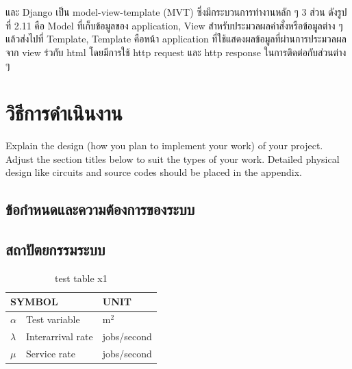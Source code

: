 \documentclass[12pt,oneside,openright,a4paper]{cpe-thai-project}
\begin{document}
\par\setlength{\parindent}{5ex}
และ Django เป็น model-view-template (MVT) ซึ่งมีกระบวนการทำงานหลัก ๆ 3 ส่วน ดังรูปที่ 2.11 คือ Model ที่เก็บข้อมูลของ application, View สำหรับประมวลผลคำสั่งหรือข้อมูลต่าง ๆ แล้วส่งไปที่ Template, Template คือหน้า application ที่ใช้แสดงผลข้อมูลที่ผ่านการประมวลผลจาก view ร่วกับ html โดยมีการใช้ http request และ http response ในการติดต่อกับส่วนต่าง ๆ 










\chapter{วิธีการดำเนินงาน}

Explain the design (how you plan to implement your work) of your project. Adjust the section titles below to suit the types of your work. Detailed physical design like circuits and source codes should be placed in the appendix.

\section{ข้อกำหนดและความต้องการของระบบ}

\section{สถาปัตยกรรมระบบ}

\begin{table}[!h]
\centering
\caption{test table x1}\label{tbl:symbols}
\begin{tabular}{@{}p{}|p{}p{}}\hline
\multicolumn{2}{l}{\textbf{SYMBOL}}  & \textbf{UNIT} \\ \hline 
$\alpha$ & Test variable\hfill & m$^2$ \\
$\lambda$ & Interarrival rate\hfill &  jobs/second\\
$\mu$ & Service rate\hfill & jobs/second \\ \hline
\end{tabular}
\end{table}
\end{document}
